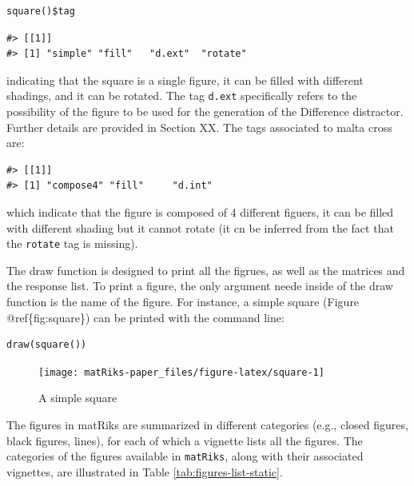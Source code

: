 \begin{verbatim}
square()$tag
\end{verbatim}

\begin{verbatim}
#> [[1]]
#> [1] "simple" "fill"   "d.ext"  "rotate"
\end{verbatim}

indicating that the square is a single figure, it can be filled with different shadings, and it can be rotated. The tag \texttt{d.ext} specifically refers to the possibility of the figure to be used for the generation of the Difference distractor. Further details are provided in Section XX.
The tags associated to malta cross are:

\begin{verbatim}
#> [[1]]
#> [1] "compose4" "fill"     "d.int"
\end{verbatim}

which indicate that the figure is composed of 4 different figuers, it can be filled with different shading but it cannot rotate (it cn be inferred from the fact that the \texttt{rotate} tag is missing).

The draw function is designed to print all the figrues, as well as the matrices and the response list.
To print a figure, the only argument neede inside of the draw function is the name of the figure.
For instance, a simple square (Figure @ref\{fig:square\}) can be printed with the command line:

\begin{verbatim}
draw(square())
\end{verbatim}

\begin{figure}

{\centering \texttt{[image: matRiks-paper\_files/figure-latex/square-1]} 

}

\caption{A simple square}\label{fig:square}
\end{figure}

The figures in matRiks are summarized in different categories (e.g., closed figures, black figures, lines), for each of which a vignette lists all the figures.
The categories
of the figures available in \texttt{matRiks}, along with their associated vignettes, are illustrated in Table \ref{tab:figures-list-static}.

